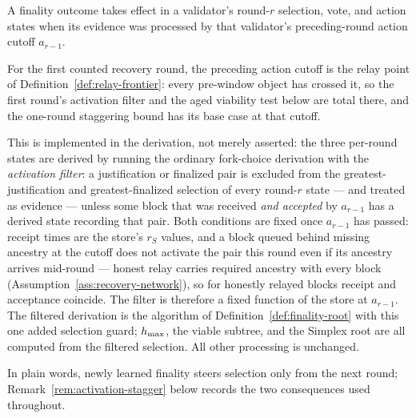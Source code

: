 \begin{definition}
\label{def:activation-filter}
A finality outcome takes effect in a validator's round-\(r\) selection,
vote, and action states when its evidence was processed by that
validator's preceding-round action cutoff \(a_{r-1}\).

For the first
counted recovery round, the preceding action cutoff is the relay point
of Definition~\ref{def:relay-frontier}: every pre-window object
has crossed it, so the first round's activation filter and the aged
viability test below are total there, and the one-round staggering bound
has its base case at that cutoff.

This is
implemented in the derivation, not merely asserted: the three per-round
states are derived by running the ordinary fork-choice derivation with
the \emph{activation filter}: a justification or finalized pair is
excluded from the greatest-justification and greatest-finalized selection
of every round-\(r\) state
--- and treated as evidence --- unless some block that was received
\emph{and accepted} by \(a_{r-1}\) has a derived
state recording that pair.  Both conditions are fixed once \(a_{r-1}\)
has passed: receipt times are the store's \(r_S\) values, and a block
queued behind missing ancestry at the cutoff does not activate the pair
this round even if its ancestry arrives mid-round --- honest relay
carries required ancestry with every block
(Assumption~\ref{ass:recovery-network}), so for honestly relayed blocks
receipt and acceptance coincide.  The filter is therefore a fixed
function of the store at \(a_{r-1}\).  The filtered derivation is the algorithm of
Definition~\ref{def:finality-root} with this one added selection guard;
\(h_{\max}\), the viable subtree, and the Simplex root are all computed
from the filtered selection.  All other
processing is unchanged.

In plain words, newly learned finality steers selection only from the
next round; Remark~\ref{rem:activation-stagger} below records the two
consequences used throughout.
\end{definition}

